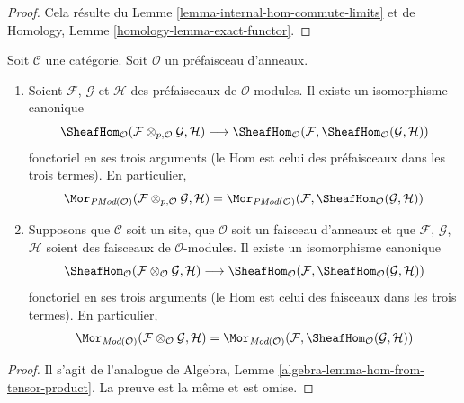 \begin{proof}
Cela résulte du Lemme \ref{lemma-internal-hom-commute-limits} et de
Homology, Lemme \ref{homology-lemma-exact-functor}.
\end{proof}

\begin{lemma}
\label{lemma-internal-hom-adjoint-tensor}
Soit $\mathcal{C}$ une catégorie. Soit $\mathcal{O}$ un préfaisceau
d'anneaux.
\begin{enumerate}
\item Soient $\mathcal{F}$, $\mathcal{G}$ et $\mathcal{H}$ des préfaisceaux
de $\mathcal{O}$-modules. Il existe un isomorphisme canonique
$$
\SheafHom_\mathcal{O}
(\mathcal{F} \otimes_{p, \mathcal{O}} \mathcal{G}, \mathcal{H})
\longrightarrow
\SheafHom_\mathcal{O}
(\mathcal{F}, \SheafHom_\mathcal{O}(\mathcal{G}, \mathcal{H}))
$$
fonctoriel en ses trois arguments (le Hom est celui des préfaisceaux dans les
trois termes). En particulier,
$$
\Mor_{\textit{PMod}(\mathcal{O})}(
\mathcal{F} \otimes_{p, \mathcal{O}} \mathcal{G}, \mathcal{H})
=
\Mor_{\textit{PMod}(\mathcal{O})}(
\mathcal{F}, \SheafHom_\mathcal{O}(\mathcal{G}, \mathcal{H}))
$$
\item
Supposons que $\mathcal{C}$ soit un site, que $\mathcal{O}$ soit un faisceau
d'anneaux et que $\mathcal{F}$, $\mathcal{G}$, $\mathcal{H}$ soient des
faisceaux de $\mathcal{O}$-modules. Il existe un isomorphisme canonique
$$
\SheafHom_\mathcal{O}
(\mathcal{F} \otimes_\mathcal{O} \mathcal{G}, \mathcal{H})
\longrightarrow
\SheafHom_\mathcal{O}
(\mathcal{F}, \SheafHom_\mathcal{O}(\mathcal{G}, \mathcal{H}))
$$
fonctoriel en ses trois arguments (le Hom est celui des faisceaux dans les
trois termes). En particulier,
$$
\Mor_{\textit{Mod}(\mathcal{O})}(
\mathcal{F} \otimes_\mathcal{O} \mathcal{G}, \mathcal{H})
=
\Mor_{\textit{Mod}(\mathcal{O})}(
\mathcal{F}, \SheafHom_\mathcal{O}(\mathcal{G}, \mathcal{H}))
$$
\end{enumerate}
\end{lemma}

\begin{proof}
Il s'agit de l'analogue de
Algebra, Lemme \ref{algebra-lemma-hom-from-tensor-product}.
La preuve est la même et est omise.
\end{proof}

